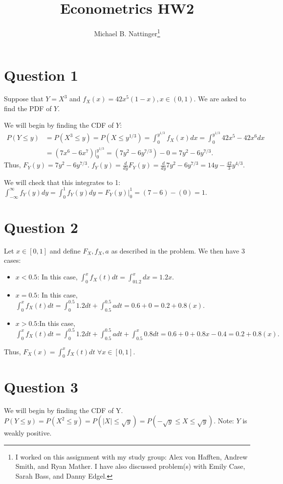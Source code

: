 \documentclass[11pt]{article} %
\title{Econometrics HW2}
\author{Michael B. Nattinger\footnote{I worked on this assignment with my study group: Alex von Hafften, Andrew Smith, and Ryan Mather. I have also discussed problem(s) with Emily Case, Sarah Bass, and Danny Edgel.}}
\begin{document}
\maketitle

\section{Question 1}
Suppose that $Y = X^{3}$ and $f_X(x) = 42x^5(1-x), x \in (0,1).$ We are asked to find the PDF of $Y$.

We will begin by finding the CDF of $Y$:
\begin{align*}
P(Y\leq y) &= P(X^{3} \leq y) = P(X \leq y^{1/3}) = \int_0^{y^{1/3}} f_X(x)dx =  \int_0^{y^{1/3}}42x^5 - 42x^6dx \\
&= (7x^6 - 6x^7)|^{y^{1/3}}_{0} = (7y^2 - 6y^{7/3}) - 0 = 7y^2 - 6y^{7/3}.
\end{align*}
Thus, $F_Y(y) =  7y^2 - 6y^{7/3}$. $f_Y(y) = \frac{d}{dy} F_Y(y) =  \frac{d}{dy} 7y^2 - 6y^{7/3} = 14y - \frac{42}{3}y^{4/3}$.

We will check that this integrates to 1:
$\int_{-\infty}^{\infty} f_Y(y)dy = \int_0^1f_Y(y)dy = F_Y(y)|^{1}_{0} = (7 - 6) - (0) = 1. $

\section{Question 2}
Let $x \in [0,1]$ and define $F_X,f_X,a$ as described in the problem. We then have 3 cases:

\begin{itemize}
\item $x<0.5$: In this case, $\int^{x}_0 f_X(t)dt = \int^{x}_01.2 dx = 1.2x.$
\item $x=0.5$: In this case,  $\int^{x}_0 f_X(t)dt = \int^{0.5}_0 1.2dt + \int^{0.5}_0.5 a dt = 0.6 + 0 = 0.2+0.8(x).$
\item $x>0.5$:In this case,  $\int^{x}_0 f_X(t)dt = \int^{0.5}_0 1.2dt + \int^{0.5}_0.5 a dt + \int^{x}_{0.5} 0.8 dt = 0.6 + 0 + 0.8x - 0.4 = 0.2+0.8(x).$
\end{itemize}

Thus, $F_X(x) = \int_0^x f_X(t)dt$ $\forall x \in [0,1].$

\section{Question 3}
We will begin by finding the CDF of Y. $P(Y\leq y) = P(X^2 \leq y) = P(|X| \leq \sqrt{y}) = P(-\sqrt{y}\leq X \leq \sqrt{y})$. Note: $Y$ is weakly positive.
\end{document}
